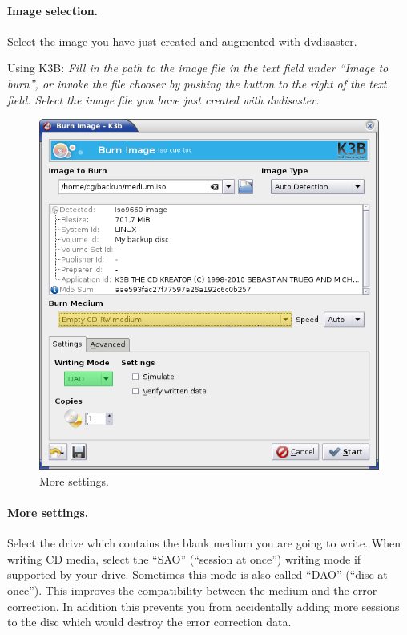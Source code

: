 \paragraph{Image selection.} Select the image you have
just created and augmented with dvdisaster.

\bigskip

Using K3B: {\em Fill in the path to the image file in the text
  field under ``Image to burn'', or invoke the file chooser
  by pushing the button to the right of the text field.
  Select the image file you have just created with dvdisaster. }

\newpage
\begin{figure}[h]
\centerline{\includegraphics[width=\textwidth]{screenshots/write-iso3.png}}
\caption{More settings.}  
\label{howto-augment-write-iso-settings}
\end{figure}

\paragraph{More settings.} Select the drive which contains the
blank medium you are going to write. When writing CD media,
select the ``SAO'' (``session at once'') writing mode if
supported by your drive. Sometimes this mode is also
called ``DAO'' (``disc at once''). This improves the compatibility
between the medium and the error correction. In addition this
prevents you from accidentally adding more sessions to the disc
which would destroy the error correction data.

